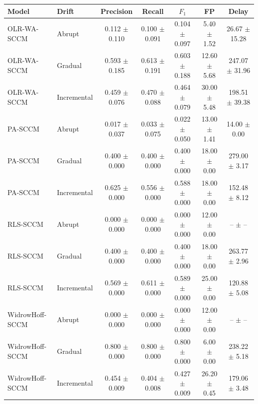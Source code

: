 \begin{tabular}{llccccc}
\toprule
Model & Drift & Precision & Recall & $F_1$ & FP & Delay \\
\midrule
OLR-WA-SCCM & Abrupt & 0.112 $\pm$ 0.110 & 0.100 $\pm$ 0.091 & 0.104 $\pm$ 0.097 & 5.40 $\pm$ 1.52 & 26.67 $\pm$ 15.28 \\
OLR-WA-SCCM & Gradual & 0.593 $\pm$ 0.185 & 0.613 $\pm$ 0.191 & 0.603 $\pm$ 0.188 & 12.60 $\pm$ 5.68 & 247.07 $\pm$ 31.96 \\
OLR-WA-SCCM & Incremental & 0.459 $\pm$ 0.076 & 0.470 $\pm$ 0.088 & 0.464 $\pm$ 0.079 & 30.00 $\pm$ 5.48 & 198.51 $\pm$ 39.38 \\
PA-SCCM & Abrupt & 0.017 $\pm$ 0.037 & 0.033 $\pm$ 0.075 & 0.022 $\pm$ 0.050 & 13.00 $\pm$ 1.41 & 14.00 $\pm$ 0.00 \\
PA-SCCM & Gradual & 0.400 $\pm$ 0.000 & 0.400 $\pm$ 0.000 & 0.400 $\pm$ 0.000 & 18.00 $\pm$ 0.00 & 279.00 $\pm$ 3.17 \\
PA-SCCM & Incremental & 0.625 $\pm$ 0.000 & 0.556 $\pm$ 0.000 & 0.588 $\pm$ 0.000 & 18.00 $\pm$ 0.00 & 152.48 $\pm$ 8.12 \\
RLS-SCCM & Abrupt & 0.000 $\pm$ 0.000 & 0.000 $\pm$ 0.000 & 0.000 $\pm$ 0.000 & 12.00 $\pm$ 0.00 & -- $\pm$ -- \\
RLS-SCCM & Gradual & 0.400 $\pm$ 0.000 & 0.400 $\pm$ 0.000 & 0.400 $\pm$ 0.000 & 18.00 $\pm$ 0.00 & 263.77 $\pm$ 2.96 \\
RLS-SCCM & Incremental & 0.569 $\pm$ 0.000 & 0.611 $\pm$ 0.000 & 0.589 $\pm$ 0.000 & 25.00 $\pm$ 0.00 & 120.88 $\pm$ 5.08 \\
WidrowHoff-SCCM & Abrupt & 0.000 $\pm$ 0.000 & 0.000 $\pm$ 0.000 & 0.000 $\pm$ 0.000 & 12.00 $\pm$ 0.00 & -- $\pm$ -- \\
WidrowHoff-SCCM & Gradual & 0.800 $\pm$ 0.000 & 0.800 $\pm$ 0.000 & 0.800 $\pm$ 0.000 & 6.00 $\pm$ 0.00 & 238.22 $\pm$ 5.18 \\
WidrowHoff-SCCM & Incremental & 0.454 $\pm$ 0.009 & 0.404 $\pm$ 0.008 & 0.427 $\pm$ 0.009 & 26.20 $\pm$ 0.45 & 179.06 $\pm$ 3.48 \\
\bottomrule
\end{tabular}
